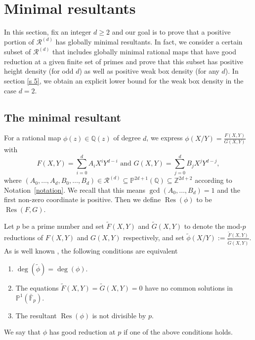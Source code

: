 \documentclass[12pt]{amsart}
\newcommand{\Z}{\mathbb{Z}}
\newcommand{\Q}{\mathbb{Q}}
\newcommand{\F}{\mathbb{F}}
\newcommand{\cR}{\mathcal{R}}
\newcommand{\op}[1]{\operatorname{#1}}
\numberwithin{equation}{section}
\begin{document}
\section{Minimal resultants}\label{s 4}

\par In this section, fix an integer $d\geq 2$ and our goal is to prove that a positive portion of
$\cR^{(d)}$ has globally minimal resultants. In fact, we consider a certain subset of $\cR^{(d)}$ that includes globally minimal rational maps that have good reduction at a given finite set of primes and prove that this subset has positive height density (for odd $d$) as well as positive weak box density (for any $d$). In section \ref{s 5}, we obtain an explicit lower bound for the weak box density in the case $d=2$. 

\subsection{The minimal resultant}
For a rational map $\phi(z)\in\Q(z)$ of degree $d$, we express $\phi(X/Y) = \frac{F(X, Y)}{G(X, Y)}$ with \[F(X,Y) = \sum_{i=0}^d A_i X^i Y^{d-i}\text{ and }
    G(X,Y) = \sum_{j=0}^d B_j X^j Y^{d-j},\]
where $(A_0, \dots, A_d, B_0, \dots, B_d)\in \cR^{(d)}\subseteq\mathbb{P}^{2d+1}(\Q)\subseteq \Z^{2d+2}$ according to Notation~\ref{notation}. We recall that this means $\gcd(A_0,\ldots,B_d)=1$
and the first non-zero coordinate is positive. Then we define $\op{Res}(\phi)$ to be $\op{Res}(F,G)$.

Let $p$ be a prime number and set $\widetilde{F}(X, Y)$ and $\widetilde{G}(X, Y)$ to denote the mod-$p$ reductions of $F(X, Y)$ and $G(X, Y)$ respectively, and set $\tilde{\phi}(X/Y):=\frac{\widetilde{F}(X, Y)}{\widetilde{G}(X, Y)}$. As is well known \cite[Theorem 2.15]{silvermantextbook}, the following conditions are equivalent
\begin{enumerate}
    \item $\op{deg}(\widetilde{\phi})=\op{deg}(\phi)$.
    \item The equations $\widetilde{F}(X, Y)=\widetilde{G}(X, Y)=0$ have no common solutions in $\mathbb{P}^1(\bar{\F}_p)$. 
    \item The resultant $\op{Res}(\phi)$ is not divisible by $p$.  
\end{enumerate}
We say that $\phi$ has good reduction at $p$ if one of the above conditions holds.
 
\end{document}
